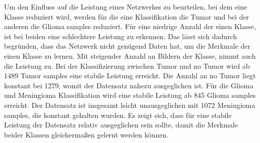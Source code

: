 Um den Einfluss auf die Leistung eines Netzwerkes zu beurteilen, bei dem eine Klasse reduziert wird,
werden für die eine Klassifikation die Tumor und bei der anderen die Glioma samples reduziert.
Für eine niedrige Anzahl der einen Klasse, ist bei beiden eine schlechtere Leistung zu erkennen.
Das lässt sich dadurch begründen, dass das Netzwerk nicht genügend Daten hat, um die Merkmale der einen Klasse zu lernen.
Mit steigender Anzahl an Bildern der Klasse, nimmt auch die Leistung zu.
Bei der Klassifizierung zwischen Tumor und no Tumor wird ab 1489 Tumor samples eine stabile Leistung erreicht.
Die Anzahl an no Tumor liegt konstant bei 1279, womit der Datensatz nahezu ausgeglichen ist.
Für die Glioma und Meningioma Klassifikation wird eine stabile Leistung ab 845 Glioma samples erreicht.
Der Datensatz ist insgesamt leicht unausgeglichen mit 1072 Meningioma samples, die konstant gehalten wurden.
Es zeigt sich, dass für eine stabile Leistung der Datensatz relativ ausgeglichen sein sollte, damit die Merkmale beider Klassen gleichermaßen gelernt werden können. 
